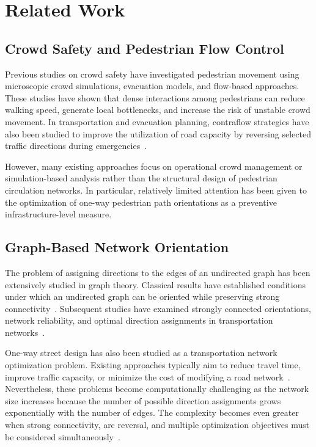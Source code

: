 \documentclass[twocolumn,a4paper]{article}
\begin{document}
\section{Related Work} \label{sec:related}

\subsection{Crowd Safety and Pedestrian Flow Control} \label{subsec:related_crowd}

Previous studies on crowd safety have investigated pedestrian movement using microscopic crowd simulations, evacuation models, and flow-based approaches. These studies have shown that dense interactions among pedestrians can reduce walking speed, generate local bottlenecks, and increase the risk of unstable crowd movement. In transportation and evacuation planning, contraflow strategies have also been studied to improve the utilization of road capacity by reversing selected traffic directions during emergencies~\cite{kim2008contraflow, aksu2014mathematical}.

However, many existing approaches focus on operational crowd management or simulation-based analysis rather than the structural design of pedestrian circulation networks. In particular, relatively limited attention has been given to the optimization of one-way pedestrian path orientations as a preventive infrastructure-level measure.

\subsection{Graph-Based Network Orientation} \label{subsec:related_graph}

The problem of assigning directions to the edges of an undirected graph has been extensively studied in graph theory. Classical results have established conditions under which an undirected graph can be oriented while preserving strong connectivity~\cite{robbins1939theorem}. Subsequent studies have examined strongly connected orientations, network reliability, and optimal direction assignments in transportation networks~\cite{chung1985strongly, roberts1988optimal, roberts1994optimal}.

One-way street design has also been studied as a transportation network optimization problem. Existing approaches typically aim to reduce travel time, improve traffic capacity, or minimize the cost of modifying a road network~\cite{drezner1997selecting, huang2020bi, huang2020model}. Nevertheless, these problems become computationally challenging as the network size increases because the number of possible direction assignments grows exponentially with the number of edges. The complexity becomes even greater when strong connectivity, arc reversal, and multiple optimization objectives must be considered simultaneously~\cite{burkard1999minimum, bangjensen2023complexity}.
\end{document}
